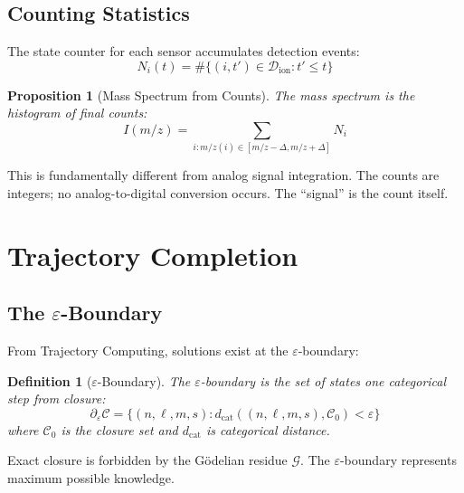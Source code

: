 \documentclass[twocolumn,10pt]{article}
\newtheorem{proposition}[theorem]{Proposition}
\newtheorem{definition}[theorem]{Definition}
\newcommand{\eps}{\varepsilon}
\newcommand{\Gres}{\mathcal{G}}
\begin{document}
\subsection{Counting Statistics}

The state counter for each sensor accumulates detection events:
\begin{equation}
    N_i(t) = \#\{(i, t') \in \mathcal{D}_{\text{ion}} : t' \leq t\}
\end{equation}

\begin{proposition}[Mass Spectrum from Counts]
The mass spectrum is the histogram of final counts:
\begin{equation}
    I(m/z) = \sum_{i : m/z(i) \in [m/z - \Delta, m/z + \Delta]} N_i
\end{equation}
\end{proposition}

This is fundamentally different from analog signal integration. The counts are integers; no analog-to-digital conversion occurs. The ``signal'' is the count itself.

\section{Trajectory Completion}
\label{sec:completion}

\subsection{The $\eps$-Boundary}

From Trajectory Computing, solutions exist at the $\eps$-boundary:

\begin{definition}[$\eps$-Boundary]
The $\eps$-boundary is the set of states one categorical step from closure:
\begin{equation}
    \partial_\eps \mathcal{C} = \{(n, \ell, m, s) : d_{\text{cat}}((n, \ell, m, s), \mathcal{C}_0) < \eps\}
\end{equation}
where $\mathcal{C}_0$ is the closure set and $d_{\text{cat}}$ is categorical distance.
\end{definition}

Exact closure is forbidden by the G\"odelian residue $\Gres$. The $\eps$-boundary represents maximum possible knowledge.
\end{document}
